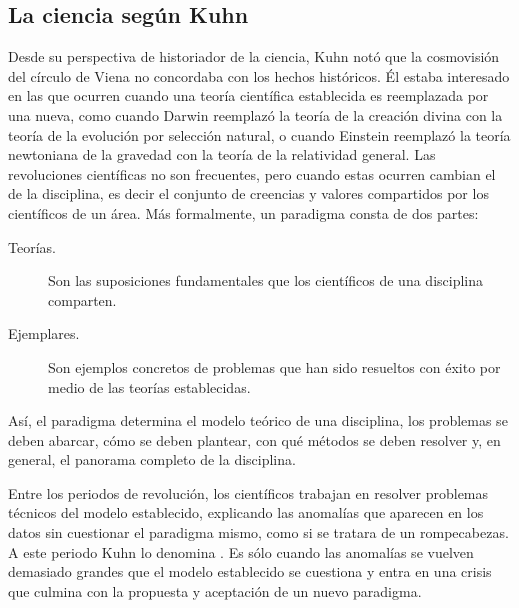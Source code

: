 \subsection*{La ciencia según Kuhn}

Desde su perspectiva de historiador de la ciencia, Kuhn notó que la cosmovisión del círculo de Viena no concordaba con los hechos históricos.
Él estaba interesado en las  que ocurren cuando una teoría científica establecida es reemplazada por una nueva, como cuando Darwin reemplazó la teoría de la creación divina con la teoría de la evolución por selección natural, o cuando Einstein reemplazó la teoría newtoniana de la gravedad con la teoría de la relatividad general.
Las revoluciones científicas no son frecuentes, pero cuando estas ocurren cambian el  de la disciplina, es decir el conjunto de creencias y valores compartidos por los científicos de un área.
Más formalmente, un paradigma consta de dos partes: \begin{description} \item[Teorías.] Son las suposiciones fundamentales que los científicos de una disciplina comparten.
	\item[Ejemplares.] Son ejemplos concretos de problemas que han sido resueltos con éxito por medio de las teorías establecidas.
\end{description} Así, el paradigma determina el modelo teórico de una disciplina, los problemas se deben abarcar, cómo se deben plantear, con qué métodos se deben resolver y, en general, el panorama completo de la disciplina.

Entre los periodos de revolución, los científicos trabajan en resolver problemas técnicos del modelo establecido, explicando las anomalías que aparecen en los datos sin cuestionar el paradigma mismo, como si se tratara de un rompecabezas.
A este periodo Kuhn lo denomina .
Es sólo cuando las anomalías se vuelven demasiado grandes que el modelo establecido se cuestiona y entra en una crisis que culmina con la propuesta y aceptación de un nuevo paradigma.



